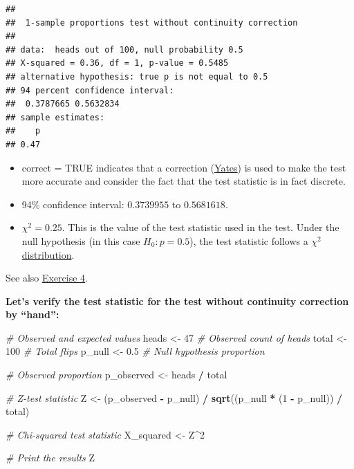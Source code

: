 \documentclass[
]{book}
\newenvironment{Shaded}{\begin{snugshade}}{\end{snugshade}}
\newcommand{\CommentTok}[1]{\textcolor[rgb]{0.56,0.35,0.01}{\textit{#1}}}
\newcommand{\DecValTok}[1]{\textcolor[rgb]{0.00,0.00,0.81}{#1}}
\newcommand{\FloatTok}[1]{\textcolor[rgb]{0.00,0.00,0.81}{#1}}
\newcommand{\FunctionTok}[1]{\textcolor[rgb]{0.13,0.29,0.53}{\textbf{#1}}}
\newcommand{\NormalTok}[1]{#1}
\newcommand{\OtherTok}[1]{\textcolor[rgb]{0.56,0.35,0.01}{#1}}
\newcommand{\SpecialCharTok}[1]{\textcolor[rgb]{0.81,0.36,0.00}{\textbf{#1}}}
\begin{document}
\begin{verbatim}
## 
##  1-sample proportions test without continuity correction
## 
## data:  heads out of 100, null probability 0.5
## X-squared = 0.36, df = 1, p-value = 0.5485
## alternative hypothesis: true p is not equal to 0.5
## 94 percent confidence interval:
##  0.3787665 0.5632834
## sample estimates:
##    p 
## 0.47
\end{verbatim}

\begin{itemize}
\item
  correct = TRUE indicates that a correction (\href{https://en.wikipedia.org/wiki/Yates\%27s_correction_for_continuity}{Yates})
  is used to make the test more accurate and consider the fact that the test statistic is in fact discrete.
\item
  94\% confidence interval: \(0.3739955\) to \(0.5681618\).
\item
  \(\chi^2 = 0.25\). This is the value of the test statistic used in the test.
  Under the null hypothesis (in this case \(H_0: p = 0.5\)),
  the test statistic follows a \href{https://en.wikipedia.org/wiki/Chi-squared_distribution}{\(\chi^2\) distribution}.
\end{itemize}

See also \hyperref[exercise4_nhst]{Exercise 4}.

\textbf{Let's verify the test statistic for the test without continuity correction by ``hand'':}

\begin{Shaded}
\begin{Highlighting}[]
\CommentTok{\# Observed and expected values}
\NormalTok{heads }\OtherTok{\textless{}{-}} \DecValTok{47}  \CommentTok{\# Observed count of heads}
\NormalTok{total }\OtherTok{\textless{}{-}} \DecValTok{100}  \CommentTok{\# Total flips}
\NormalTok{p\_null }\OtherTok{\textless{}{-}} \FloatTok{0.5}  \CommentTok{\# Null hypothesis proportion}

\CommentTok{\# Observed proportion}
\NormalTok{p\_observed }\OtherTok{\textless{}{-}}\NormalTok{ heads }\SpecialCharTok{/}\NormalTok{ total}

\CommentTok{\# Z{-}test statistic}
\NormalTok{Z }\OtherTok{\textless{}{-}}\NormalTok{ (p\_observed }\SpecialCharTok{{-}}\NormalTok{ p\_null) }\SpecialCharTok{/} \FunctionTok{sqrt}\NormalTok{((p\_null }\SpecialCharTok{*}\NormalTok{ (}\DecValTok{1} \SpecialCharTok{{-}}\NormalTok{ p\_null)) }\SpecialCharTok{/}\NormalTok{ total)}

\CommentTok{\# Chi{-}squared test statistic}
\NormalTok{X\_squared }\OtherTok{\textless{}{-}}\NormalTok{ Z}\SpecialCharTok{\^{}}\DecValTok{2}

\CommentTok{\# Print the results}
\NormalTok{Z}
\end{Highlighting}
\end{Shaded}
\end{document}
